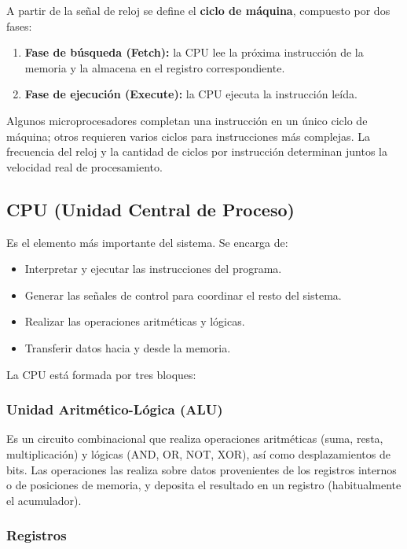A partir de la señal de reloj se define el \textbf{ciclo de máquina}, compuesto por dos fases:

\begin{enumerate}
  \item \textbf{Fase de búsqueda (Fetch):} la CPU lee la próxima instrucción de la memoria y la almacena en el registro correspondiente.
  \item \textbf{Fase de ejecución (Execute):} la CPU ejecuta la instrucción leída.
\end{enumerate}

Algunos microprocesadores completan una instrucción en un único ciclo de máquina; otros requieren varios ciclos para instrucciones más complejas. La frecuencia del reloj y la cantidad de ciclos por instrucción determinan juntos la velocidad real de procesamiento.

\subsection{CPU (Unidad Central de Proceso)}

Es el elemento más importante del sistema. Se encarga de:

\begin{itemize}
  \item Interpretar y ejecutar las instrucciones del programa.
  \item Generar las señales de control para coordinar el resto del sistema.
  \item Realizar las operaciones aritméticas y lógicas.
  \item Transferir datos hacia y desde la memoria.
\end{itemize}

La CPU está formada por tres bloques:

\subsubsection{Unidad Aritmético-Lógica (ALU)}

Es un circuito combinacional que realiza operaciones aritméticas (suma, resta, multiplicación) y lógicas (AND, OR, NOT, XOR), así como desplazamientos de bits. Las operaciones las realiza sobre datos provenientes de los registros internos o de posiciones de memoria, y deposita el resultado en un registro (habitualmente el acumulador).

\subsubsection{Registros}

